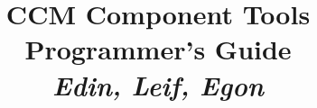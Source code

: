 \documentclass{book}
\begin{document}
\title{{\Huge CCM Component Tools} \vspace{1cm} \\Programmer's Guide\\ {\it Edin, Leif, Egon} }

\maketitle
\tableofcontents








\begin{appendix}

\end{appendix}




\end{document}
